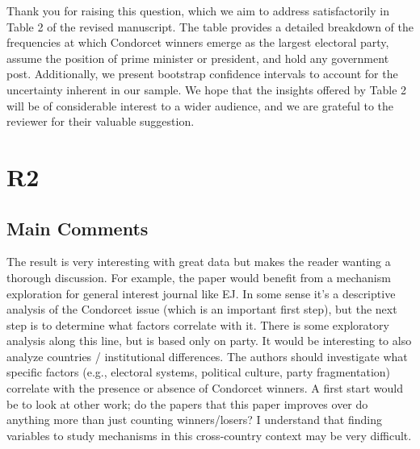 \documentclass[a4paper, 12pt]{scrartcl}
\theoremstyle{break}
\newenvironment{changes}{\par\color{violet}\par\addvspace{\baselineskip}}{\par\addvspace{\baselineskip}}
\begin{document}
Thank you for raising this question, which we aim to address satisfactorily in Table 2 of the revised manuscript. The table provides a detailed breakdown of the frequencies at which Condorcet winners emerge as the largest electoral party, assume the position of prime minister or president, and hold any government post. Additionally, we present bootstrap confidence intervals to account for the uncertainty inherent in our sample. We hope that the insights offered by Table 2 will be of considerable interest to a wider audience, and we are grateful to the reviewer for their valuable suggestion.


\newpage
\section{R2}
\subsection{Main Comments}
\begin{changes}
	The result is very interesting with great data but makes the reader wanting a thorough discussion. For example, the paper would benefit from a mechanism exploration for general interest journal like EJ. In some sense it’s a descriptive analysis of the Condorcet issue (which is an important first step), but the next step is to determine what factors correlate with it. There is some exploratory analysis along this line, but is based only on party. It would be interesting to also analyze countries / institutional differences. The authors should investigate what specific factors (e.g., electoral systems, political culture, party fragmentation) correlate with the presence or absence of Condorcet winners. A first start would be to look at other work; do the papers
	that this paper improves over do anything more than just counting winners/losers? I understand that finding variables to study mechanisms in this cross-country context may be very difficult.
\end{changes}
\end{document}
